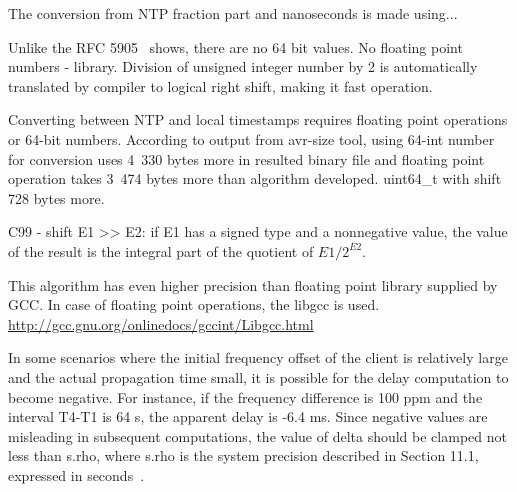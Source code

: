 The conversion from NTP fraction part and nanoseconds is made using...

Unlike the RFC 5905~\cite{rfc5905} shows, there are no 64 bit values. %
No floating point numbers - library.
Division of unsigned integer number by 2 is automatically translated by compiler to logical right shift,
making it fast operation.

Converting between NTP and local timestamps requires floating point operations or 64-bit numbers.
According to output from avr-size tool, using 64-int number for conversion
uses 4~330 bytes more in %
resulted binary file
and floating point operation takes 3~474 bytes more
than algorithm developed.
uint64\_t with shift 728 bytes more.

C99 - shift E1 >> E2: if E1 has a signed type and a nonnegative value, the value of
the result is the integral part of the quotient of $E1 / 2^{E2}$.

This algorithm has even higher precision than floating point library
supplied by GCC.
In case of floating point operations, the libgcc is used.
\url{http://gcc.gnu.org/onlinedocs/gccint/Libgcc.html}

%
In some scenarios where the initial frequency offset of the client is
  relatively large and the actual propagation time small, it is
   possible for the delay computation to become negative.  For instance,
   if the frequency difference is 100 ppm and the interval T4-T1 is 64
   s, the apparent delay is -6.4 ms.  Since negative values are
   misleading in subsequent computations, the value of delta should be
   clamped not less than s.rho, where s.rho is the system precision
   described in Section 11.1, expressed in seconds~\cite{rfc5905}.
%
